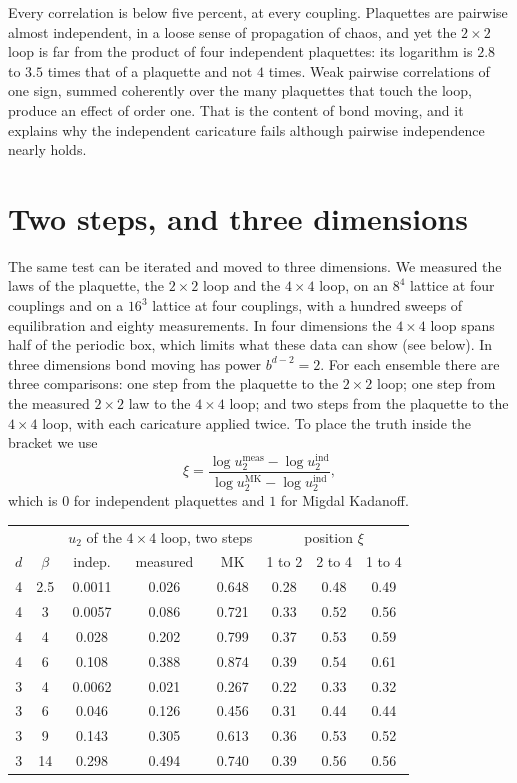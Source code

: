 Every correlation is below five percent, at every coupling. Plaquettes are pairwise almost independent, in a loose sense of propagation of chaos, and yet the $2\times2$ loop is far from the product of four independent plaquettes: its logarithm is $2.8$ to $3.5$ times that of a plaquette and not $4$ times. Weak pairwise correlations of one sign, summed coherently over the many plaquettes that touch the loop, produce an effect of order one. That is the content of bond moving, and it explains why the independent caricature fails although pairwise independence nearly holds.

\section{Two steps, and three dimensions}

The same test can be iterated and moved to three dimensions. We measured the laws of the plaquette, the $2\times2$ loop and the $4\times4$ loop, on an $8^4$ lattice at four couplings and on a $16^3$ lattice at four couplings, with a hundred sweeps of equilibration and eighty measurements. In four dimensions the $4\times4$ loop spans half of the periodic box, which limits what these data can show (see below). In three dimensions bond moving has power $b^{d-2}=2$. For each ensemble there are three comparisons: one step from the plaquette to the $2\times2$ loop; one step from the measured $2\times2$ law to the $4\times4$ loop; and two steps from the plaquette to the $4\times4$ loop, with each caricature applied twice. To place the truth inside the bracket we use
\[
\xi=\frac{\log u_2^{\mathrm{meas}}-\log u_2^{\mathrm{ind}}}{\log u_2^{\mathrm{MK}}-\log u_2^{\mathrm{ind}}},
\]
which is $0$ for independent plaquettes and $1$ for Migdal Kadanoff.

\begin{center}
\footnotesize
\begin{tabular}{cccccccc}
\toprule
 & & \multicolumn{3}{c}{$u_2$ of the $4\times4$ loop, two steps} & \multicolumn{3}{c}{position $\xi$} \\
$d$ & $\beta$ & indep. & measured & MK & 1 to 2 & 2 to 4 & 1 to 4 \\ \midrule
4 & 2.5 & 0.0011 & 0.026 & 0.648 & 0.28 & 0.48 & 0.49 \\
4 & 3 & 0.0057 & 0.086 & 0.721 & 0.33 & 0.52 & 0.56 \\
4 & 4 & 0.028 & 0.202 & 0.799 & 0.37 & 0.53 & 0.59 \\
4 & 6 & 0.108 & 0.388 & 0.874 & 0.39 & 0.54 & 0.61 \\
3 & 4 & 0.0062 & 0.021 & 0.267 & 0.22 & 0.33 & 0.32 \\
3 & 6 & 0.046 & 0.126 & 0.456 & 0.31 & 0.44 & 0.44 \\
3 & 9 & 0.143 & 0.305 & 0.613 & 0.36 & 0.53 & 0.52 \\
3 & 14 & 0.298 & 0.494 & 0.740 & 0.39 & 0.56 & 0.56 \\
\bottomrule
\end{tabular}
\end{center}

